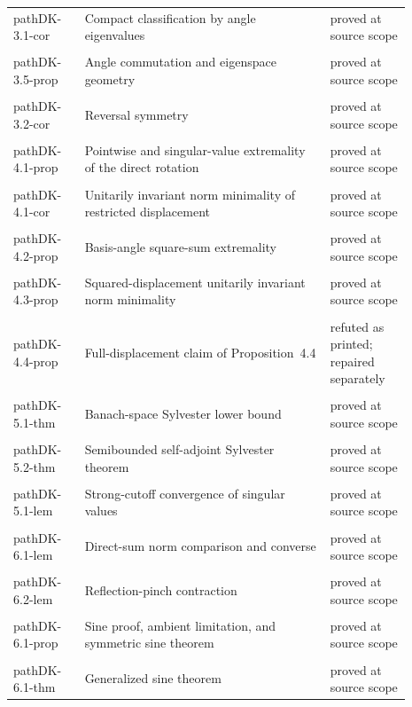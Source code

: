 \begin{longtable}{>{\raggedright\arraybackslash}p{0.16\linewidth}>{\raggedright\arraybackslash}p{0.55\linewidth}>{\raggedright\arraybackslash}p{0.18\linewidth}}
\\path{DK-3.1-cor} & Compact classification by angle eigenvalues & proved at source scope \\
\\path{DK-3.5-prop} & Angle commutation and eigenspace geometry & proved at source scope \\
\\path{DK-3.2-cor} & Reversal symmetry & proved at source scope \\
\\path{DK-4.1-prop} & Pointwise and singular-value extremality of the direct rotation & proved at source scope \\
\\path{DK-4.1-cor} & Unitarily invariant norm minimality of restricted displacement & proved at source scope \\
\\path{DK-4.2-prop} & Basis-angle square-sum extremality & proved at source scope \\
\\path{DK-4.3-prop} & Squared-displacement unitarily invariant norm minimality & proved at source scope \\
\\path{DK-4.4-prop} & Full-displacement claim of Proposition~4.4 & refuted as printed; repaired separately \\
\\path{DK-5.1-thm} & Banach-space Sylvester lower bound & proved at source scope \\
\\path{DK-5.2-thm} & Semibounded self-adjoint Sylvester theorem & proved at source scope \\
\\path{DK-5.1-lem} & Strong-cutoff convergence of singular values & proved at source scope \\
\\path{DK-6.1-lem} & Direct-sum norm comparison and converse & proved at source scope \\
\\path{DK-6.2-lem} & Reflection-pinch contraction & proved at source scope \\
\\path{DK-6.1-prop} & Sine proof, ambient limitation, and symmetric sine theorem & proved at source scope \\
\\path{DK-6.1-thm} & Generalized sine theorem & proved at source scope \\

\end{longtable}
